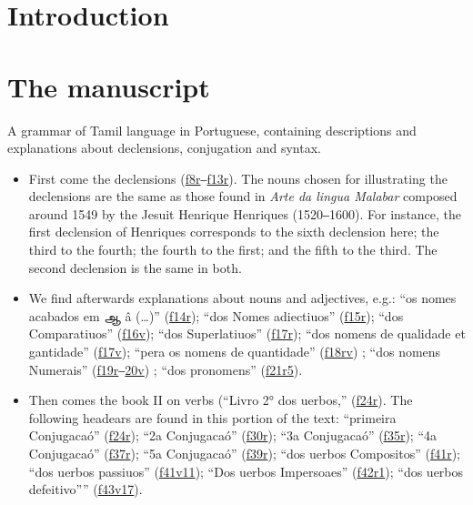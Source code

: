 \documentclass[12pt,a4paper]{scrbook}
\begin{document}
\newpage

\tableofcontents

\part{Introduction}
    
\part{The manuscript}
\newpage
                       

A grammar of Tamil language in Portuguese, containing descriptions and explanations about declensions, conjugation and syntax.
                     
\begin{itemize}
    
                         
\item First come the declensions (\hyperlink{img-25}{f8r}‒\hyperlink{img-35}{f13r}). The nouns chosen for illustrating the declensions are the same as those found in \emph{Arte da lingua Malabar} composed around 1549 by the Jesuit Henrique Henriques (1520‒1600). For instance, the first declension of Henriques corresponds to the sixth declension here; the third to the fourth; the fourth to the first; and the fifth to the third. The second declension is the same in both.
    
                         
\item We find afterwards explanations about nouns and adjectives, e.g.: “os nomes acabados em ஆ â (…)” (\hyperlink{img-37}{f14r}); “dos Nomes adiectiuos” (\hyperlink{img-39}{f15r}); “dos Comparatiuos” (\hyperlink{img-41}{f16v}); “dos Superlatiuos” (\hyperlink{img-43}{f17r}); “dos nomens de qualidade et gantidade” (\hyperlink{img-44}{f17v}); “pera os nomens de quantidade” (\hyperlink{img-45}{f18r}\hyperlink{img-46}{v}) ; “dos nomens Numerais” (\hyperlink{img-47}{f19r}‒\hyperlink{img-50}{20v}) ; “dos pronomens” (\hyperlink{img-51}{f21r5}).
    
                         
\item Then comes the book II on verbs (“Livro 2° dos uerbos,” (\hyperlink{img-57}{f24r}). The following headears are found in this portion of the text: “primeira Conjugacaó” (\hyperlink{img-57}{f24r}); “2a Conjugacaó” (\hyperlink{img-69}{f30r}); “3a Conjugacaó” (\hyperlink{img-79}{f35r}); “4a Conjugacaó” (\hyperlink{img-83}{f37r}); “5a Conjugacaó” (\hyperlink{img-87}{f39r}); “dos uerbos Compositos” (\hyperlink{img-91}{f41r}); “dos uerbos passiuos” (\hyperlink{img-91}{f41v11}); “Dos uerbos Impersoaes” (\hyperlink{img-93}{f42r1}); “dos uerbos defeitivo”” (\hyperlink{img-96}{f43v17}).
    

\end{itemize}
\end{document}
